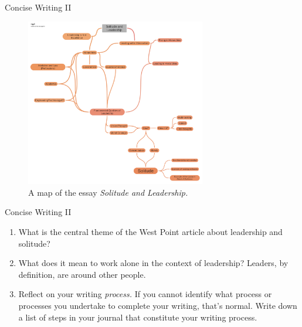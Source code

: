 \documentclass{beamer}
\begin{document}
\begin{frame}{Concise Writing II}
\begin{figure}
\includegraphics[width=0.7\textwidth]{figures/Solitude_and_Leadership.pdf}
\caption{\label{fig:leadership}  A map of the essay \textit{Solitude and Leadership.}}
\end{figure}
\end{frame}

\begin{frame}{Concise Writing II}
\begin{enumerate}
\item What is the central theme of the West Point article about leadership and solitude?
\item What does it mean to work alone in the context of leadership?  Leaders, by definition, are around other people.
\item Reflect on your writing \textit{process.}  If you cannot identify what process or processes you undertake to complete your writing, that's normal.  Write down a list of steps in your journal that constitute your writing process.
\end{enumerate}
\end{frame}
\end{document}
